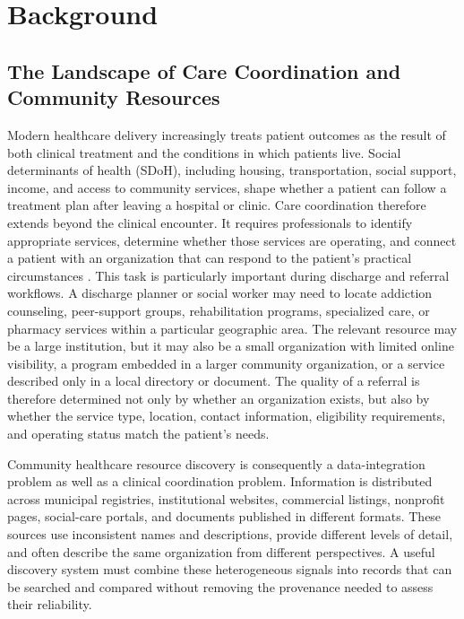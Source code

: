\documentclass[12pt,oneside]{report}
\begin{document}
\section{Background}

\subsection{The Landscape of Care Coordination and Community Resources}
Modern healthcare delivery increasingly treats patient outcomes as the result of both clinical treatment and the conditions in which patients live. Social determinants of health (SDoH), including housing, transportation, social support, income, and access to community services, shape whether a patient can follow a treatment plan after leaving a hospital or clinic. Care coordination therefore extends beyond the clinical encounter. It requires professionals to identify appropriate services, determine whether those services are operating, and connect a patient with an organization that can respond to the patient's practical circumstances \cite{44,45}.
This task is particularly important during discharge and referral workflows. A discharge planner or social worker may need to locate addiction counseling, peer-support groups, rehabilitation programs, specialized care, or pharmacy services within a particular geographic area. The relevant resource may be a large institution, but it may also be a small organization with limited online visibility, a program embedded in a larger community organization, or a service described only in a local directory or document. The quality of a referral is therefore determined not only by whether an organization exists, but also by whether the service type, location, contact information, eligibility requirements, and operating status match the patient's needs.

Community healthcare resource discovery is consequently a data-integration problem as well as a clinical coordination problem. Information is distributed across municipal registries, institutional websites, commercial listings, nonprofit pages, social-care portals, and documents published in different formats. These sources use inconsistent names and descriptions, provide different levels of detail, and often describe the same organization from different perspectives. A useful discovery system must combine these heterogeneous signals into records that can be searched and compared without removing the provenance needed to assess their reliability.
\end{document}
